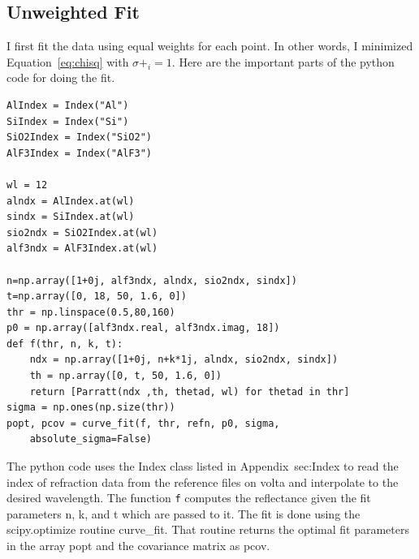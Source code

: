 \documentclass[english]{scrartcl}
\begin{document}
\subsection{Unweighted Fit}
I first fit the data using equal weights for each point. In other words,
I minimized Equation~\ref{eq:chisq} with $\sigma+_i=1$. Here are the
important parts of the python code for doing the fit.
\begin{lstlisting}
AlIndex = Index("Al")
SiIndex = Index("Si")
SiO2Index = Index("SiO2")
AlF3Index = Index("AlF3")

wl = 12
alndx = AlIndex.at(wl)
sindx = SiIndex.at(wl)
sio2ndx = SiO2Index.at(wl)
alf3ndx = AlF3Index.at(wl)

n=np.array([1+0j, alf3ndx, alndx, sio2ndx, sindx])
t=np.array([0, 18, 50, 1.6, 0])
thr = np.linspace(0.5,80,160)
p0 = np.array([alf3ndx.real, alf3ndx.imag, 18])
def f(thr, n, k, t):
    ndx = np.array([1+0j, n+k*1j, alndx, sio2ndx, sindx])
    th = np.array([0, t, 50, 1.6, 0])
    return [Parratt(ndx ,th, thetad, wl) for thetad in thr]
sigma = np.ones(np.size(thr))
popt, pcov = curve_fit(f, thr, refn, p0, sigma,
    absolute_sigma=False)

\end{lstlisting}
The python code uses the Index class listed in Appendix~{sec:Index}
to read the index of refraction data from the reference files on volta
and interpolate to the desired wavelength. The function \verb+f+
computes the reflectance given the fit parameters n, k, and t which are
passed to it. The fit is done using the scipy.optimize routine
curve\_fit. That routine returns the optimal fit parameters in the
array popt and the covariance matrix as pcov.
\end{document}

